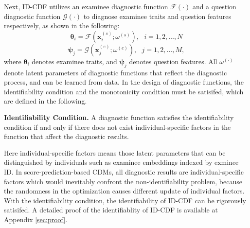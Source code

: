 \documentclass[sigconf]{acmart}
\begin{document}
\par Next, ID-CDF utilizes an examinee diagnostic function $\mathcal{F}(\cdot)$ and a question diagnostic function $\mathcal{G}(\cdot)$ to diagnose examinee traits and question features respectively, as shown in the following:
\begin{equation}
  \bm{\theta}_i = \mathcal{F}\left(\bm{x}_i^{(s)}; \omega^{(s)}\right),\,\,\,\,i=1,2,\ldots,N
\end{equation}
\vspace{-5pt}
\begin{equation}
  \bm{\psi}_j = \mathcal{G}\left(\bm{x}_j^{(e)}; \omega^{(e)}\right),\,\,\,\,j=1,2,\ldots,M,
\end{equation}
where $\bm{\theta}_i$ denotes examinee traits, and $\bm{\psi}_j$ denotes question features. All $\omega^{(\cdot)}$ denote latent parameters of diagnostic functions that reflect the diagnostic process, and can be learned from data. In the design of diagnostic functions, the identifiability condition and the monotonicity condition must be satisifed, which are defined in the following.

\begin{definition}\label{def:id}
  \textbf{Identifiability Condition.} A diagnostic function satisfies the identifiability condition if and only if there does not exist individual-specific factors in the function that affect the diagnostic results.
\end{definition}
\par Here individual-specific factors means those latent parameters that can be distinguished by individuals such as examinee embeddings indexed by exminee ID. In score-prediction-based CDMs, all diagnostic results are individual-specific factors which would inevitably confront the non-identifiability problem, because the randomness in the optimization causes different update of individual factors. With the identifiability condition, the identifiability of ID-CDF can be rigorously satisifed. A detailed proof of the identifiablity of ID-CDF is available at Appendix \ref{sec:proof}.
\end{document}
